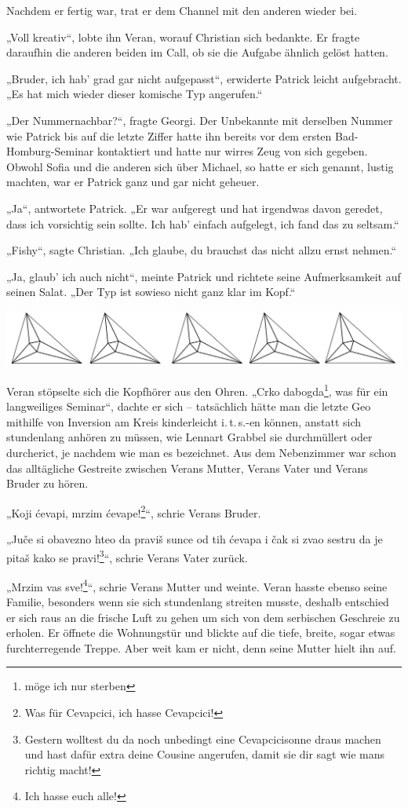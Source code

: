 \documentclass[oneside]{memoir}
\newcommand{\parasep}{
\bigskip
\bigskip
\begin{center} 
   \includegraphics[scale=.08]{parasep5.jpg} 
\end{center}
\bigskip
\bigskip
}
\begin{document}
Nachdem er fertig war, trat er dem Channel mit den anderen wieder bei.

„Voll kreativ“, lobte ihn Veran, worauf Christian sich bedankte. Er fragte daraufhin die anderen beiden im Call, ob sie die Aufgabe ähnlich gelöst hatten.

„Bruder, ich hab' grad gar nicht aufgepasst“, erwiderte Patrick leicht aufgebracht. „Es hat mich wieder dieser komische Typ angerufen.“

„Der Nummernachbar?“, fragte Georgi. Der Unbekannte mit derselben Nummer wie Patrick bis auf die letzte Ziffer hatte ihn bereits vor dem ersten Bad-Homburg-Seminar kontaktiert und hatte nur wirres Zeug von sich gegeben. Obwohl Sofia und die anderen sich über Michael, so hatte er sich genannt, lustig machten, war er Patrick ganz und gar nicht geheuer.

„Ja“, antwortete Patrick. „Er war aufgeregt und hat irgendwas davon geredet, dass ich vorsichtig sein sollte. Ich hab' einfach aufgelegt, ich fand das zu seltsam.“

„Fishy“, sagte Christian. „Ich glaube, du brauchst das nicht allzu ernst nehmen.“

„Ja, glaub' ich auch nicht“, meinte Patrick und richtete seine Aufmerksamkeit auf seinen Salat. „Der Typ ist sowieso nicht ganz klar im Kopf.“

\parasep

Veran stöpselte sich die Kopfhörer aus den Ohren. „Crko dabogda\footnote{möge ich nur sterben}, was für ein langweiliges Seminar“, dachte er sich -- tatsächlich hätte man die letzte Geo mithilfe von Inversion am Kreis kinderleicht i.\,t.\,s.-en können, anstatt sich stundenlang anhören zu müssen, wie Lennart Grabbel sie durchmüllert oder durcherict, je nachdem wie man es bezeichnet. Aus dem Nebenzimmer war schon das alltägliche Gestreite zwischen Verans Mutter, Verans Vater und Verans Bruder zu hören.

„Koji ćevapi, mrzim ćevape!\footnote{Was für Cevapcici, ich hasse Cevapcici!}“, schrie Verans Bruder.

„Juče si obavezno hteo da praviš sunce od tih ćevapa i čak si zvao sestru da je pitaš kako se pravi!\footnote{Gestern wolltest du da noch unbedingt eine Cevapcicisonne draus machen und hast dafür extra deine Cousine angerufen, damit sie dir sagt wie mans richtig macht!}“, schrie Verans Vater zurück.

„Mrzim vas sve!\footnote{Ich hasse euch alle!}“, schrie Verans Mutter und weinte. Veran hasste ebenso seine Familie, besonders wenn sie sich stundenlang streiten musste, deshalb entschied er sich raus an die frische Luft zu gehen um sich von dem serbischen Geschreie zu erholen. Er öffnete die Wohnungstür und blickte auf die tiefe, breite, sogar etwas furchterregende Treppe. Aber weit kam er nicht, denn seine Mutter hielt ihn auf.
\end{document}
